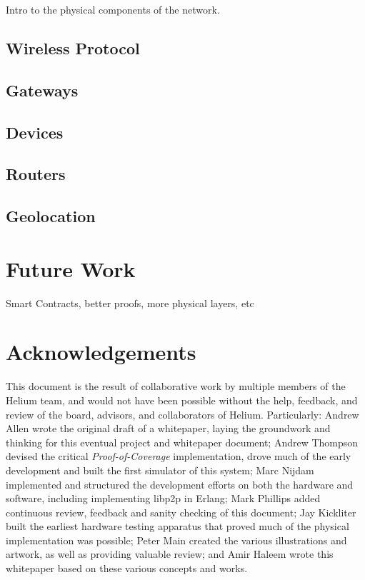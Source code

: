 \documentclass[letterpaper,11pt]{article}
\def\proofofcoverage/{\textit{Proof-of-Coverage}}
\begin{document}
Intro to the physical components of the network.

\subsection{Wireless Protocol}

\subsection{Gateways}

\subsection{Devices}

\subsection{Routers}

\subsection{Geolocation}

\section{Future Work}

Smart Contracts, better proofs, more physical layers, etc

\newpage

\section{Acknowledgements}

This document is the result of collaborative work by multiple members of the Helium team, and would not have been possible without the help, feedback, and review of the board, advisors, and collaborators of Helium. Particularly: Andrew Allen wrote the original draft of a whitepaper, laying the groundwork and thinking for this eventual project and whitepaper document; Andrew Thompson devised the critical \proofofcoverage/ implementation, drove much of the early development and built the first simulator of this system; Marc Nijdam implemented and structured the development efforts on both the hardware and software, including implementing libp2p in Erlang; Mark Phillips added continuous review, feedback and sanity checking of this document; Jay Kickliter built the earliest hardware testing apparatus that proved much of the physical implementation was possible; Peter Main created the various illustrations and artwork, as well as providing valuable review; and Amir Haleem wrote this whitepaper based on these various concepts and works.\newline
\end{document}
